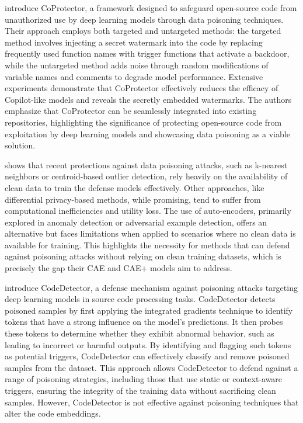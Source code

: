 \cite{sun2022coprotector} introduce CoProtector, a framework designed to safeguard open-source code from unauthorized use by deep learning models through data poisoning techniques. Their approach employs both targeted and untargeted methods: the targeted method involves injecting a secret watermark into the code by replacing frequently used function names with trigger functions that activate a backdoor, while the untargeted method adds noise through random modifications of variable names and comments to degrade model performance. Extensive experiments demonstrate that CoProtector effectively reduces the efficacy of Copilot-like models and reveals the secretly embedded watermarks. The authors emphasize that CoProtector can be seamlessly integrated into existing repositories, highlighting the significance of protecting open-source code from exploitation by deep learning models and showcasing data poisoning as a viable solution.

\cite{razmi2023classification} shows that recent protections against data poisoning attacks, such as k-nearest neighbors or centroid-based outlier detection, rely heavily on the availability of clean data to train the defense models effectively. Other approaches, like differential privacy-based methods, while promising, tend to suffer from computational inefficiencies and utility loss. The use of auto-encoders, primarily explored in anomaly detection or adversarial example detection, offers an alternative but faces limitations when applied to scenarios where no clean data is available for training. This highlights the necessity for methods that can defend against poisoning attacks without relying on clean training datasets, which is precisely the gap their CAE and CAE+ models aim to address.


\cite{Li2024} introduce CodeDetector, a defense mechanism against poisoning attacks targeting deep learning models in source code processing tasks. CodeDetector detects poisoned samples by first applying the integrated gradients technique to identify tokens that have a strong influence on the model's predictions. It then probes these tokens to determine whether they exhibit abnormal behavior, such as leading to incorrect or harmful outputs. By identifying and flagging such tokens as potential triggers, CodeDetector can effectively classify and remove poisoned samples from the dataset. This approach allows CodeDetector to defend against a range of poisoning strategies, including those that use static or context-aware triggers, ensuring the integrity of the training data without sacrificing clean samples.
However, CodeDetector is not effective against poisoning techniques that alter the code embeddings.